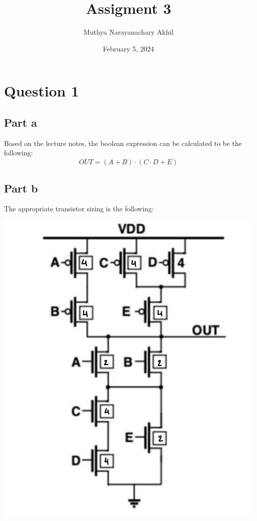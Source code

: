 \documentclass{article}
\title{Assigment 3}
\author{Muthya Narayanachary Akhil}
\date{February 5, 2024}
\begin{document}
\maketitle

\section*{Question 1}
\subsection*{Part a}

Based on the lecture notes, the boolean expression can be calculated to be the following:
\begin{equation}
    \bar{OUT} = (A + B) \cdot (C \cdot D + E)
\end{equation}

\subsection*{Part b}
The appropriate transistor sizing is the following:

\includegraphics[scale = 0.5]{transistorsizing.png}
\end{document}
